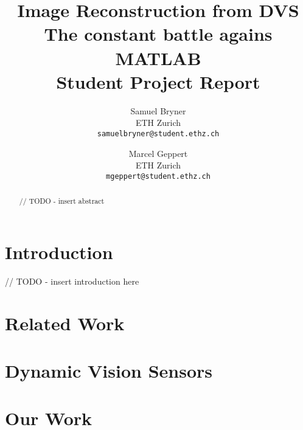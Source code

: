 \documentclass[10pt,twocolumn,letterpaper]{article}
\begin{document}
\title{Image Reconstruction from DVS\\ The constant battle agains MATLAB\\ Student Project Report}

\author{Samuel Bryner\\
ETH Zurich\\
{\tt\small samuelbryner@student.ethz.ch}
\and
Marcel Geppert\\
ETH Zurich\\
{\tt\small mgeppert@student.ethz.ch}
}

\maketitle

\begin{abstract}

// TODO - insert abstract

\end{abstract}

\section{Introduction}

// TODO - insert introduction here

\section{Related Work}



\section{Dynamic Vision Sensors}



\section{Our Work}
\end{document}
